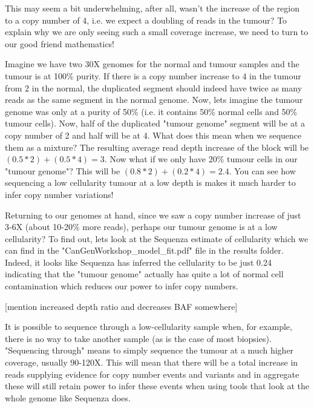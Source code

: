 This may seem a bit underwhelming, after all, wasn't the increase of the region to a copy number of 4, i.e. we expect a doubling of reads in the tumour? To explain why we are only seeing such a small coverage increase, we need to turn to our good friend mathematics!

Imagine we have two 30X genomes for the normal and tumour samples and the tumour is at 100\% purity. If there is a copy number increase to 4 in the tumour from 2 in the normal, the duplicated segment should indeed have twice as many reads as the same segment in the normal genome. Now, lets imagine the tumour genome was only at a purity of 50\% (i.e. it contains 50\% normal cells and 50\% tumour cells). Now, half of the duplicated "tumour genome" segment will be at a copy number of 2 and half will be at 4. What does this mean when we sequence them as a mixture? The resulting average read depth increase of the block will be $(0.5*2)+(0.5*4) = 3$. Now what if we only have 20\% tumour cells in our "tumour genome"? This will be $(0.8*2)+(0.2*4) = 2.4$. You can see how sequencing a low cellularity tumour at a low depth is makes it much harder to infer copy number variations!

Returning to our genomes at hand, since we saw a copy number increase of just 3-6X (about 10-20\% more reads), perhaps our tumour genome is at a low cellularity? To find out, lets look at the Sequenza estimate of cellularity which we can find in the "CanGenWorkshop_model_fit.pdf" file in the results folder. Indeed, it looks like Sequenza has inferred the cellularity to be just 0.24 indicating that the "tumour genome" actually has quite a lot of normal cell contamination which reduces our power to infer copy numbers.

[mention increased depth ratio and decreases BAF somewhere]

\begin{note}
It is possible to sequence through a low-cellularity sample when, for example, there is no way to take another sample (as is the case of most biopsies). "Sequencing through" means to simply sequence the tumour at a much higher coverage, usually 90-120X. This will mean that there will be a total increase in reads supplying evidence for copy number events and variants and in aggregate these will still retain power to infer these events when using tools that look at the whole genome like Sequenza does.
\end{note}


